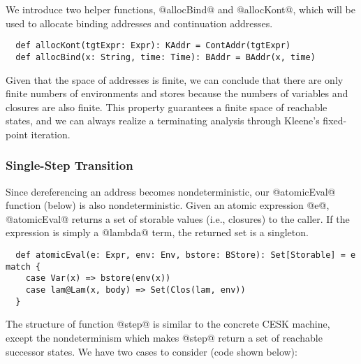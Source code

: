 \documentclass[acmsmall, screen]{acmart}\settopmatter{}
\begin{document}
We introduce two helper functions, @allocBind@ and @allocKont@, which will be
used to allocate binding addresses and continuation addresses.

\begin{lstlisting}
  def allocKont(tgtExpr: Expr): KAddr = ContAddr(tgtExpr)
  def allocBind(x: String, time: Time): BAddr = BAddr(x, time)
\end{lstlisting}

Given that the space of addresses is finite, we can conclude that there are only finite numbers
of environments and stores because the numbers of variables and closures are also finite.
This property guarantees a finite space of reachable states, and we can always realize a
terminating analysis through Kleene's fixed-point iteration.

\subsubsection{Single-Step Transition}

Since dereferencing an address becomes nondeterministic, our @atomicEval@
function (below) is also nondeterministic. Given an atomic expression @e@,
@atomicEval@ returns a set of storable values (i.e., closures) to the caller.
If the expression is simply a @lambda@ term, the returned set is a singleton.

\begin{lstlisting}
  def atomicEval(e: Expr, env: Env, bstore: BStore): Set[Storable] = e match {
    case Var(x) => bstore(env(x))
    case lam@Lam(x, body) => Set(Clos(lam, env))
  }
\end{lstlisting}

The structure of function @step@ is similar to the concrete CESK machine,
except the nondeterminism which makes @step@ return a set of reachable successor states.
We have two cases to consider (code shown below):
\end{document}
